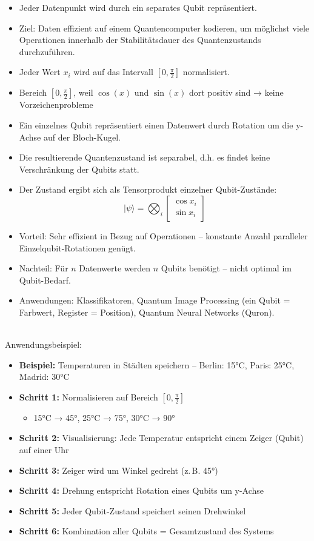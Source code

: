 \begin{itemize}
\item Jeder Datenpunkt wird durch ein separates Qubit repräsentiert.
\item Ziel: Daten effizient auf einem Quantencomputer kodieren, um möglichst viele Operationen innerhalb der Stabilitätsdauer des Quantenzustands durchzuführen.
\item Jeder Wert \(x_i\) wird auf das Intervall \([0, \frac{\pi}{2}]\) normalisiert.
\item Bereich \([0, \frac{\pi}{2}]\), weil \(\cos(x)\) und \(\sin(x)\) dort positiv sind → keine Vorzeichenprobleme
\item Ein einzelnes Qubit repräsentiert einen Datenwert durch  Rotation um die y-Achse auf der Bloch-Kugel.
\item Die resultierende Quantenzustand ist separabel, d.h. es findet keine Verschränkung der Qubits statt.
\item Der Zustand ergibt sich als Tensorprodukt einzelner Qubit-Zustände: 
\[
|\psi\rangle = \bigotimes_i \begin{bmatrix} \cos x_i \\ \sin x_i \end{bmatrix}
\]
\item Vorteil: Sehr effizient in Bezug auf Operationen – konstante Anzahl paralleler Einzelqubit-Rotationen genügt.
\item Nachteil: Für \(n\) Datenwerte werden \(n\) Qubits benötigt – nicht optimal im Qubit-Bedarf.
\item Anwendungen: Klassifikatoren, Quantum Image Processing (ein Qubit = Farbwert, Register = Position), Quantum Neural Networks (Quron).
\end{itemize}
\cite{encoding patterns for quantum algorithms}
\\


Anwendungsbeispiel:
\begin{itemize}
\item \textbf{Beispiel:} Temperaturen in Städten speichern – Berlin: 15°C, Paris: 25°C, Madrid: 30°C
\item \textbf{Schritt 1:} Normalisieren auf Bereich \([0, \frac{\pi}{2}]\)
  \begin{itemize}
    \item 15°C → 45°, 25°C → 75°, 30°C → 90°
  \end{itemize}
\item \textbf{Schritt 2:} Visualisierung: Jede Temperatur entspricht einem Zeiger (Qubit) auf einer Uhr
\item \textbf{Schritt 3:} Zeiger wird um Winkel gedreht (z.\,B. 45°)
\item \textbf{Schritt 4:} Drehung entspricht Rotation eines Qubits um y-Achse
\item \textbf{Schritt 5:} Jeder Qubit-Zustand speichert seinen Drehwinkel
\item \textbf{Schritt 6:} Kombination aller Qubits = Gesamtzustand des Systems
\end{itemize}


